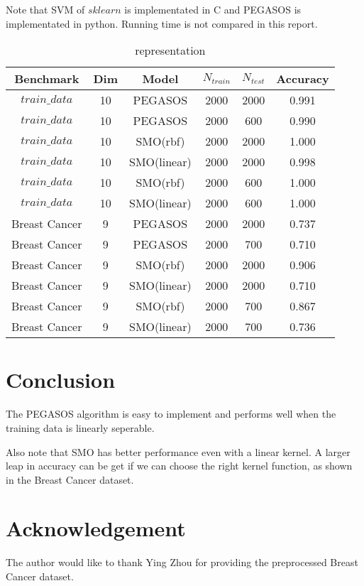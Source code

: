 \documentclass[conference]{IEEEtran}
\begin{document}
Note that SVM of $sklearn$ is implementated in C and PEGASOS is implementated in python. Running time is not compared in this report.
\begin{table}[H]
    \caption{representation}
    \centering
    \begin{tabular}{cccccc}
    \toprule
    Benchmark &Dim&Model & $N_{train}$&$N_{test}$&Accuracy \\
    \midrule

    $train\_data$&10&PEGASOS&2000&2000&0.991 \\
    $train\_data$&10&PEGASOS&2000&600&0.990\\
    $train\_data$&10&SMO(rbf)&2000&2000&1.000\\
    $train\_data$&10&SMO(linear)&2000&2000&0.998\\
    $train\_data$&10&SMO(rbf)&2000&600&1.000\\
    $train\_data$&10&SMO(linear)&2000&600&1.000\\
    Breast Cancer&9&PEGASOS&2000&2000&0.737\\
    Breast Cancer&9&PEGASOS&2000&700&0.710\\
    Breast Cancer&9&SMO(rbf)&2000&2000&0.906\\
    Breast Cancer&9&SMO(linear)&2000&2000&0.710\\
    Breast Cancer&9&SMO(rbf)&2000&700&0.867\\
    Breast Cancer&9&SMO(linear)&2000&700&0.736\\
    \bottomrule
    \end{tabular}
    \label{table:1}
    \end{table}

\section{Conclusion}
The PEGASOS algorithm is easy to implement and performs well when the training data is linearly seperable. 

Also note that SMO has better performance even with a linear kernel. A larger leap in accuracy can be get if we can choose the right kernel function, as shown in the Breast Cancer dataset.


\section{Acknowledgement}
The author would like to thank Ying Zhou for providing the preprocessed Breast Cancer dataset.




\end{document}

